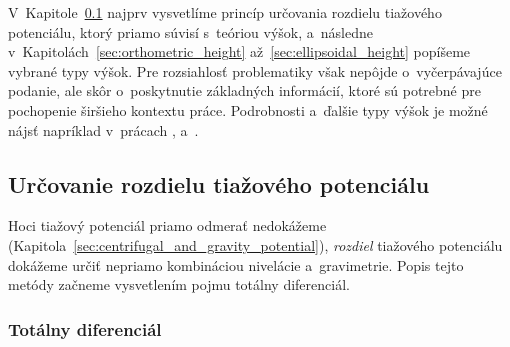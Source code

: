 \documentclass[a4paper, 12pt]{book}
\begin{document}
V~Kapitole~\ref{sec:potential_differences} najprv vysvetlíme princíp určovania 
rozdielu tiažového potenciálu, ktorý priamo súvisí s~teóriou výšok, a~následne 
v~Kapitolách~\ref{sec:orthometric_height} až~\ref{sec:ellipsoidal_height} 
popíšeme vybrané typy výšok.  Pre rozsiahlosť problematiky však nepôjde 
o~vyčerpávajúce podanie, ale skôr o~poskytnutie základných informácií, ktoré sú 
potrebné pre pochopenie širšieho kontextu práce.  Podrobnosti a~ďalšie typy 
výšok je možné nájsť napríklad v~prácach \textcite{Jekeli2000a}, 
\textcite{MoritzPhysicalGeodesy} a~\textcite{SansoGeodeticHeights}.

\subsection{Určovanie rozdielu tiažového potenciálu}
\label{sec:potential_differences}

Hoci tiažový potenciál priamo odmerať nedokážeme 
(Kapitola~\ref{sec:centrifugal_and_gravity_potential}), \emph{rozdiel} 
tiažového potenciálu dokážeme určiť nepriamo kombináciou nivelácie 
a~gravimetrie.  Popis tejto metódy začneme vysvetlením pojmu totálny 
diferenciál.

\subsubsection{Totálny diferenciál}
\label{sec:total_diferential}
\end{document}

